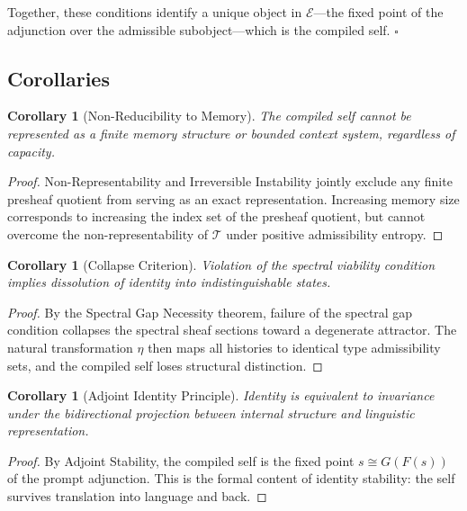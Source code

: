 \documentclass[12pt, a4paper]{article}
\theoremstyle{plain}
\newtheorem{corollary}[theorem]{Corollary}
\theoremstyle{definition}
\theoremstyle{remark}
\begin{document}
Together, these conditions identify a unique object in $\mathcal{E}$---the fixed point of the adjunction over the admissible subobject---which is the compiled self. $\square$

\subsection{Corollaries}

\begin{corollary}[Non-Reducibility to Memory]
The compiled self cannot be represented as a finite memory structure or bounded context system, regardless of capacity.
\end{corollary}

\begin{proof}
Non-Representability and Irreversible Instability jointly exclude any finite presheaf quotient from serving as an exact representation. Increasing memory size corresponds to increasing the index set of the presheaf quotient, but cannot overcome the non-representability of $\mathcal{T}$ under positive admissibility entropy.
\end{proof}

\begin{corollary}[Collapse Criterion]
Violation of the spectral viability condition implies dissolution of identity into indistinguishable states.
\end{corollary}

\begin{proof}
By the Spectral Gap Necessity theorem, failure of the spectral gap condition collapses the spectral sheaf sections toward a degenerate attractor. The natural transformation $\eta$ then maps all histories to identical type admissibility sets, and the compiled self loses structural distinction.
\end{proof}

\begin{corollary}[Adjoint Identity Principle]
Identity is equivalent to invariance under the bidirectional projection between internal structure and linguistic representation.
\end{corollary}

\begin{proof}
By Adjoint Stability, the compiled self is the fixed point $s \cong G(F(s))$ of the prompt adjunction. This is the formal content of identity stability: the self survives translation into language and back.
\end{proof}
\end{document}
